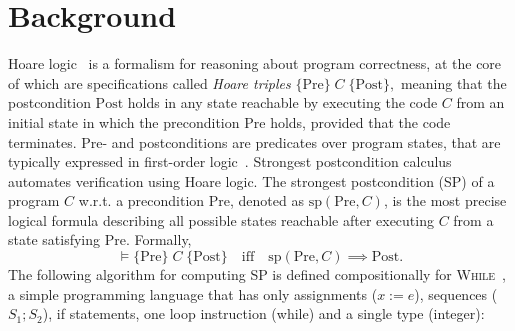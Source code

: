 \documentclass[sigconf]{acmart}
\begin{document}

\vspace{-2mm}
\section{Background}
\label{sec:background}

Hoare logic~\cite{hoare1969axiomatic} is a formalism for reasoning about program correctness, at the core of which are specifications called \emph{Hoare triples} $\{\mathrm{Pre}\}\;C\;\{\mathrm{Post}\},$ meaning that the postcondition $\mathrm{Post}$ holds in any state reachable by executing the code $C$ from an initial state in which the precondition $\mathrm{Pre}$ holds, provided that the code terminates. Pre- and postconditions are predicates over program states, that are typically expressed in first-order logic~\cite{filliatre2013why3}. Strongest postcondition calculus~\cite{dijkstra1976discipline} automates verification using Hoare logic. The strongest postcondition (SP) of a program \( C \) w.r.t. a precondition \( \text{Pre} \), denoted as \( \text{sp}(\text{Pre}, C) \), is the most precise logical formula describing all possible states reachable after executing \( C \) from a state satisfying \( \text{Pre} \). Formally, $$\models \{\text{Pre}\}\;C\;\{\text{Post}\} \quad \text{iff} \quad \text{sp}(\text{Pre}, C) \implies \text{Post}.$$ The following algorithm for computing SP is defined compositionally for \textsc{While}~\cite{nielson2015principles}, a simple programming language that has only assignments ($x := e$), sequences ($S_1; S_2$), if statements, one loop instruction (while) and a single type (integer):
\end{document}
